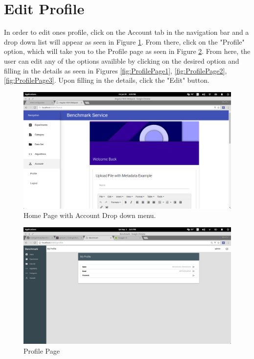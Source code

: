 \documentclass[11pt,a4paper]{article}
\begin{document}
\section{Edit Profile}
In order to edit ones profile, click on the Account tab in the navigation bar and a drop down list will appear as seen in Figure \ref{fig:AccountPage}.
From there, click on the "Profile" option, which will take you to the Profile page as seen in Figure \ref{fig:ProfilePage}.
From here, the user can edit any of the options availible by clicking on the desired option and filling in the details as seen in
Figures \ref{fig:ProfilePage1}, \ref{fig:ProfilePage2}, \ref{fig:ProfilePage3}. Upon filling in the details, click the "Edit" button.
\begin{figure}[H]
	\begin{center}
		\includegraphics[scale=0.3]{../Images/User Manual/Account Page.png}
		\caption{Home Page with Account Drop down menu.}
		\label{fig:AccountPage}
	\end{center}  
\end{figure}
\begin{figure}[H]
	\begin{center}
		\includegraphics[scale=0.3]{../Images/User Manual/Profile Page.png}
		\caption{Profile Page}
		\label{fig:ProfilePage}
	\end{center}  
\end{figure}
\end{document}
